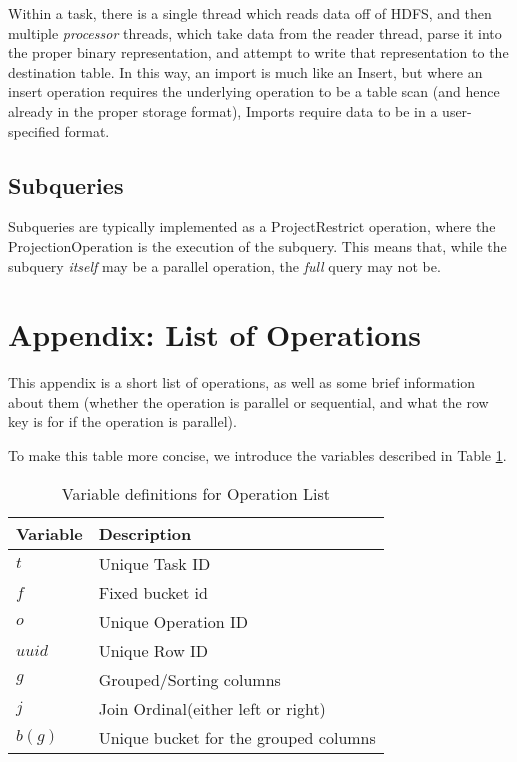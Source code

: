 Within a task, there is a single thread which reads data off of HDFS, and then multiple \emph{processor} threads, which take data from the reader thread, parse it into the proper binary representation, and attempt to write that representation to the destination table. In this way, an import is much like an Insert, but where an insert operation requires the underlying operation to be a table scan (and hence already in the proper storage format), Imports require data to be in a user-specified format.

\subsection{Subqueries}
Subqueries are typically implemented as a ProjectRestrict operation, where the ProjectionOperation is the execution of the subquery. This means that, while the subquery \emph{itself} may be a parallel operation, the \emph{full} query may not be.

\section{Appendix: List of Operations}
This appendix is a short list of operations, as well as some brief information about them (whether the operation is parallel or sequential, and what the row key is for \temp if the operation is parallel).

To make this table more concise, we introduce the variables described in Table \ref{table:op-legend}.

\clearpage
\begin{table}
\begin{tabular}{|l|l|}
				\hline
				\bf{Variable}	&	\bf{Description}								\\	\hline
				$t$			&	Unique Task ID												\\	\hline
				$f$			&	Fixed bucket id												\\	\hline
				$o$			&	Unique Operation ID										\\	\hline
				$uuid$	&	Unique Row ID													\\	\hline
				$g$			& Grouped/Sorting columns								\\	\hline
				$j$			&	Join Ordinal(either left or right)		\\	\hline
				$b(g)$	& Unique bucket for the grouped columns	\\	\hline
\end{tabular}
\\
\caption{Variable definitions for Operation List}
\label{table:op-legend}
\end{table}

